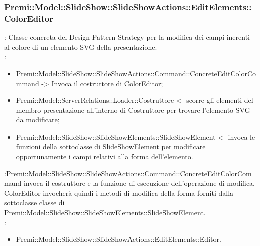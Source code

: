 {            \subsubsection{Premi::Model::SlideShow::SlideShowActions::EditElements::ColorEditor}{
				\textbf{\tipo}: Classe concreta del Design Pattern Strategy per la modifica dei campi inerenti al colore di un elemento SVG della presentazione.\\	
				\textbf{\relaz}: 
				\begin{itemize}
					\item Premi::Model::SlideShow::SlideShowActions::Command::ConcreteEditColorCommand -> Invoca il costruttore di ColorEditor;
                    \item Premi::Model::ServerRelations::Loader::Costruttore <- scorre gli elementi del membro presentazione all'interno di Costruttore per trovare l'elemento SVG da modificare; 
                    \item Premi::Model::SlideShow::SlideShowElements::SlideShowElement <- invoca le funzioni della sottoclasse di SlideShowElement per modificare opportunamente i campi relativi alla forma dell’elemento.
				\end{itemize}	\textbf{\interfacce}:Premi::Model::SlideShow::SlideShowActions::Command::ConcreteEditColorCommand invoca il costruttore e la funzione di esecuzione dell’operazione di modifica, ColorEditor invocherà quindi i metodi di modifica della forma forniti dalla sottoclasse classe di Premi::Model::SlideShow::SlideShowElements::SlideShowElement.\\
                \textbf{\base}: 
                    \begin{itemize}
                    \item Premi::Model::SlideShow::SlideShowActions::EditElements::Editor.
                    \end{itemize}
                    }
}
